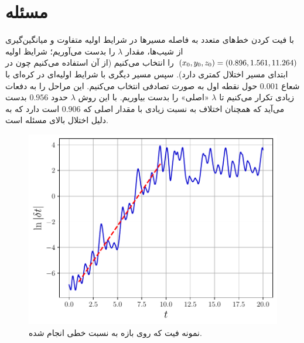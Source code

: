 \documentclass[12pt,a4paper]{article}
\begin{document}
	\section{مسئله }
	با فیت کردن خط‌های متعدد به فاصله مسیرها در شرایط اولیه متفاوت و میانگین‌گیری از شیب‌ها، مقدار $\lambda$
	را بدست می‌آوریم؛ شرایظ اولیه
	$\qty(x_0, y_0, z_0) = (0.896, 1.561, 11.264)$
	را انتخاب می‌کنیم (از آن استفاده می‌کنیم چون در ابتدای مسیر اختلال کمتری دارد). سپس مسیر دیگری با شرایط اولیه‌ای
	در کره‌ای با شعاع $0.001$ حول نقطه اول به صورت تصادفی انتخاب می‌کنیم. این مراحل را به دفعات زیادی تکرار می‌کنیم
	تا $\lambda$ «اصلی» را بدست بیاوریم. با این روش $\lambda$ حدود $0.956$ بدست می‌آید که همچنان اختلاف به نسبت زیادی با
	مقدار اصلی که $0.906$ است دارد که به دلیل اختلال بالای مسئله است.
	\begin{figure}[h!]
		\centering
		\includegraphics[width=\linewidth]{fig/9.3.9}
		\caption{نمونه فیت که روی بازه به نسبت خطی انجام شده.}
	\end{figure}
\end{document}
